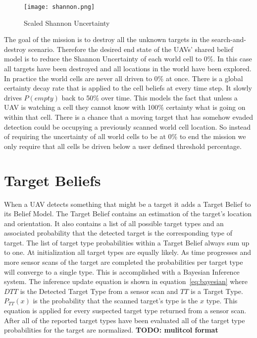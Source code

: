 \begin{multicols}{2}

\begin{figure}[H]
	\centering
	\texttt{[image: shannon.png]}
	\caption{Scaled Shannon Uncertainty}
	\label{fig:shannon}
\end{figure}

The goal of the mission is to destroy all the unknown targets in the search-and-destroy scenario.  Therefore the desired end state of the UAVs' shared belief model is to reduce the Shannon Uncertainty of each world cell to 0\%.  In this case all targets have been destroyed and all locations in the world have been explored.  In practice the world cells are never all driven to 0\% at once.  There is a global certainty decay rate that is applied to the cell beliefs at every time step.  It slowly drives $P(empty)$ back to 50\% over time.  This models the fact that unless a UAV is watching a cell they cannot know with 100\% certainty what is going on within that cell.  There is a chance that a moving target that has somehow evaded detection could be occupying a previously scanned world cell location.  So instead of requiring the uncertainty of all world cells to be at 0\% to end the mission we only require that all cells be driven below a user defined threshold percentage.

\section{Target Beliefs}
When a UAV detects something that might be a target it adds a Target Belief to its Belief Model.  The Target Belief contains an estimation of the target's location and orientation.  It also contains a list of all possible target types and an associated probability that the detected target is the corresponding type of target. The list of target type probabilities within a Target Belief always sum up to one.  At initialization all target types are equally likely.  As time progresses and more sensor scans of the target are completed the probabilities per target type will converge to a single type.  This is accomplished with a Bayesian Inference system.  The inference update equation is shown in equation~\ref{eq:bayesian} where $DTT$ is the Detected Target Type from a sensor scan and $TT$ is a Target Type. $P_{TT}(x)$ is the probability that the scanned target's type is the $x$ type.  This equation is applied for every suspected target type returned from a sensor scan.  After all of the reported target types have been evaluated all of the target type probabilities for the target are normalized. \textbf{TODO: mulitcol format}



\end{multicols}

